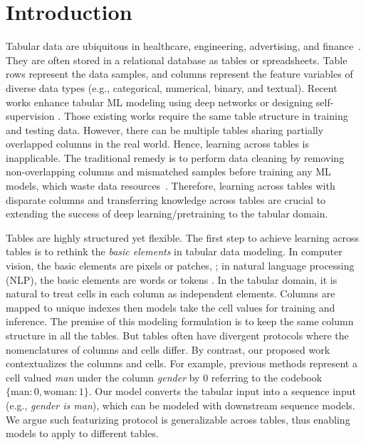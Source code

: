 \section{Introduction}\label{sec:introduction}
Tabular data are ubiquitous in healthcare, engineering, advertising, and  finance~\cite{wang2017deep,yoon2020vime,zhang2020customer,wang2020data}. They are often stored in a relational database as  tables or spreadsheets. Table rows represent the data samples, and columns represent the feature variables of diverse data types (e.g., categorical, numerical, binary, and textual). Recent works enhance tabular ML modeling using deep networks \cite{huang2020tabtransformer,padhi2021tabular,cholakov2022gatedtabtransformer,wang2021survtrace} or designing self-supervision \cite{yoon2020vime, ucar2021subtab,somepalli2021saint,bahri2022scarf}. Those existing works require the same table structure in training and testing data. However, there can be multiple tables sharing partially overlapped columns in the real world. Hence, learning across tables is inapplicable. The traditional remedy is to perform data cleaning by removing non-overlapping columns and mismatched samples before training any ML models, which waste data resources~\cite{nargesian2018table,zhu2019josie,dong2021efficient}. Therefore, learning across tables with disparate columns and transferring knowledge across tables are crucial to extending the success of deep learning/pretraining to the tabular domain.

Tables are highly structured yet flexible. The first step to achieve learning across tables is to rethink the \emph{basic elements} in tabular data modeling. In computer vision, the basic elements are pixels \cite{he2021masked} or patches, \cite{dosovitskiy2020image,bao2021beit}; in natural language processing (NLP), the basic elements are words \cite{mikolov2013efficient} or tokens \cite{schuster2012japanese,devlin2018bert}. In the tabular domain, it is natural to treat cells in each column as independent elements. Columns are mapped to unique indexes then models take the cell values for training and inference. The premise of this modeling formulation is to keep the same column structure in all the tables. But tables often have divergent protocols where the nomenclatures of columns and cells differ. By contrast, our proposed work contextualizes the columns and cells. For example, previous methods represent a cell valued \textit{man} under the column \textit{gender} by $0$ referring to the codebook $\{\text{man}:0,\text{woman}:1\}$.  Our model converts the tabular input into a sequence input (e.g., \textit{gender is man}),  which can be modeled with downstream sequence models. We argue such featurizing protocol is generalizable across tables, thus enabling models to apply to different tables.

